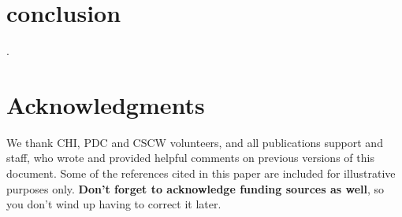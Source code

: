 \documentclass{sigchi}
\begin{document}
\section {conclusion}

 \cite{Kim:2015ii}.



\section{Acknowledgments}

We thank CHI, PDC and CSCW volunteers, and all publications support
and staff, who wrote and provided helpful comments on previous
versions of this document.  Some of the references cited in this paper
are included for illustrative purposes only.  \textbf{Don't forget
to acknowledge funding sources as well}, so you don't wind up
having to correct it later.

%
%
%
%
%
\balance



\end{document}
